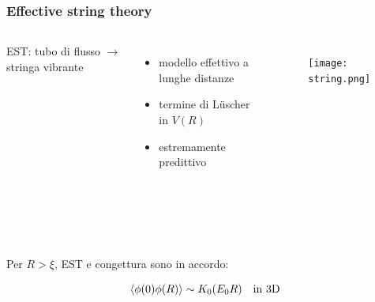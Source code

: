 \documentclass{beamer}
\begin{document}
\begin{frame}
	\frametitle{Effective string theory}

	\begin{columns}
			EST: tubo di flusso $\rightarrow$ stringa vibrante
			\begin{itemize}
				\item modello effettivo a lunghe distanze
				\item termine di L{\"u}scher in $V(R)$
				\item estremamente predittivo
			\end{itemize}

			\begin{figure}[h]
				\centering
				\texttt{[image: string.png]}
			\end{figure}			

	\end{columns}

	\

	\

	Per $R > \xi$, \alert{EST e congettura sono in accordo}:

	\begin{equation*}
		\expval{\phi(0) \phi(R)} \sim K_0(E_0 R) \quad \text{in 3D}
	\end{equation*}

\end{frame}
\end{document}
